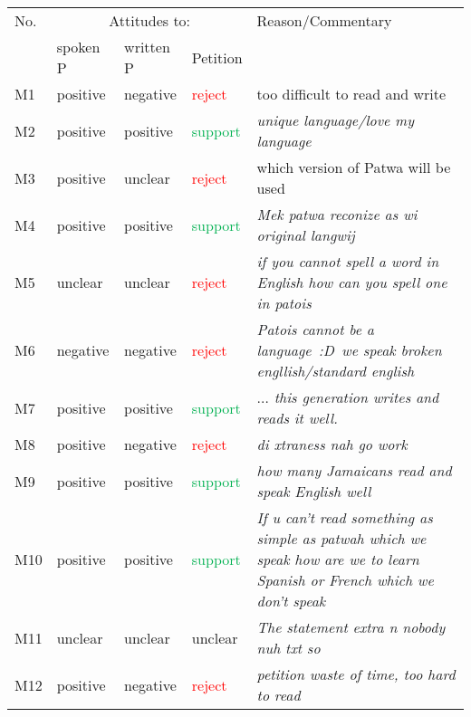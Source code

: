 \documentclass[output=paper,colorlinks,citecolor=brown]{langscibook}
\begin{document}
\begin{longtable}{llllp{6cm}}
\lsptoprule
{{No.}} & \multicolumn{3}{c}{{Attitudes to:}} & {{Reason\slash Commentary}} \\\cmidrule(lr){2-4}
& {{spoken P}} & {{written P}} & {{Petition}} &\\
\midrule
 {M1} & {positive} & {negative} & {\textcolor[HTML]{FF0000}{reject}} & {too difficult to read and write} \\
 {M2} & {positive} & {positive} & {\textcolor[HTML]{00B050}{support}} & {\textit{unique language\slash love my language}} \\
 {M3} & {positive} & {unclear} & {\textcolor[HTML]{FF0000}{reject}} & {which version of Patwa will be used} \\
 {M4} & {positive} & {positive} & {\textcolor[HTML]{00B050}{support}} & {\textit{\textcolor[HTML]{1C1E21}{Mek patwa reconize as wi original langwij}}} \\
 {M5} & {unclear} & {unclear} & {\textcolor[HTML]{FF0000}{reject}} & {\textit{\textcolor[HTML]{1C1E21}{if you cannot spell a word in English how can you spell one in patois}}} \\
 {M6} & {negative} & {negative} & {\textcolor[HTML]{FF0000}{reject}} & {\textit{\textcolor[HTML]{1C1E21}{Patois cannot be a language :D we speak broken engllish/standard english}}} \\
 {M7} & {positive} & {positive} & {\textcolor[HTML]{00B050}{support}} & {\textit{$\ldots$\textcolor[HTML]{1C1E21}{ this generation writes and reads it well.}}} \\
 {M8} & {positive} & {negative} & {\textcolor[HTML]{FF0000}{reject}} & {\textit{\textcolor[HTML]{1C1E21}{di xtraness nah go work}}} \\
 {M9} & {positive} & {positive} & {\textcolor[HTML]{00B050}{support}} & {\textit{\textcolor[HTML]{1C1E21}{how many Jamaicans read and speak English well}}} \\
 {M10} & {positive} & {positive} & {\textcolor[HTML]{00B050}{support}} & {\textit{\textcolor[HTML]{1C1E21}{If u can't read something as simple as patwah which we speak how are we to learn Spanish or French which we don't speak}}} \\
 {M11} & {unclear} & {unclear} & {unclear} & {\textit{\textcolor[HTML]{1C1E21}{The statement extra n nobody nuh txt so}}} \\
 {M12} & {positive} & {negative} & {\textcolor[HTML]{FF0000}{reject}} & {\textit{petition waste of time, too hard to read}} \\

\end{longtable}
\end{document}
